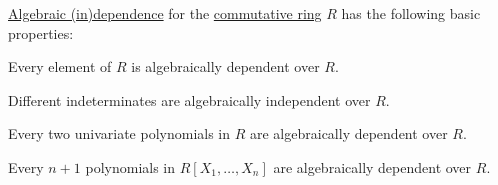 \begin{proposition}\label{thm:def:algebraic_dependence}
  \hyperref[def:algebraic_dependence]{Algebraic (in)dependence} for the \hyperref[def:ring/commutative]{commutative ring} \( R \) has the following basic properties:
  \begin{thmenum}
     Every element of \( R \) is algebraically dependent over \( R \).

     Different indeterminates are algebraically independent over \( R \).

     Every two univariate polynomials in \( R \) are algebraically dependent over \( R \).

     Every \( n + 1 \) polynomials in \( R[X_1, \ldots, X_n] \) are algebraically dependent over \( R \).
  \end{thmenum}
\end{proposition}
